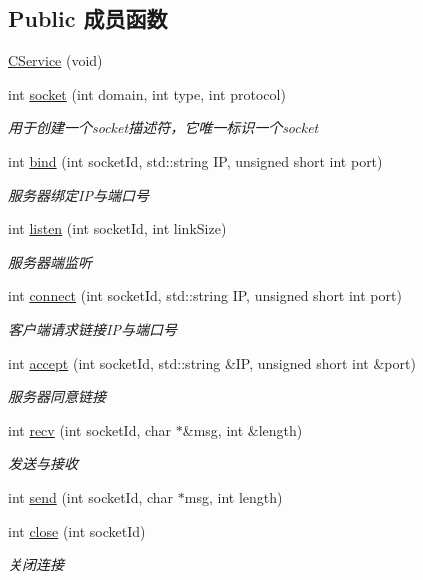 \subsection*{Public 成员函数}
\begin{DoxyCompactItemize}
\item 
\hyperlink{class_c_service_ac4fb853bd01a2b0d71399ab28de19cc6}{C\+Service} (void)
\item 
int \hyperlink{class_c_service_ae632f34f3aceab829b89ee46374658f2}{socket} (int domain, int type, int protocol)
\begin{DoxyCompactList}\small\item\em 用于创建一个socket描述符，它唯一标识一个socket \end{DoxyCompactList}\item 
int \hyperlink{class_c_service_ab345d03f1f85d053472b05de3ea211eb}{bind} (int socket\+Id, std\+::string IP, unsigned short int port)
\begin{DoxyCompactList}\small\item\em 服务器绑定\+I\+P与端口号 \end{DoxyCompactList}\item 
int \hyperlink{class_c_service_a32f59bebc1aef849f38b72218a87c674}{listen} (int socket\+Id, int link\+Size)
\begin{DoxyCompactList}\small\item\em 服务器端监听 \end{DoxyCompactList}\item 
int \hyperlink{class_c_service_a4788fc741e72baeaa5e15e459494f661}{connect} (int socket\+Id, std\+::string IP, unsigned short int port)
\begin{DoxyCompactList}\small\item\em 客户端请求链接\+I\+P与端口号 \end{DoxyCompactList}\item 
int \hyperlink{class_c_service_a694c7ac8c230b0d1d11bc98a32abcd71}{accept} (int socket\+Id, std\+::string \&IP, unsigned short int \&port)
\begin{DoxyCompactList}\small\item\em 服务器同意链接 \end{DoxyCompactList}\item 
int \hyperlink{class_c_service_a221d063aa8a89ecc84084e1bbd287210}{recv} (int socket\+Id, char $\ast$\&msg, int \&length)
\begin{DoxyCompactList}\small\item\em 发送与接收 \end{DoxyCompactList}\item 
int \hyperlink{class_c_service_a883e80cc5ea699e8408bbffe7c18414b}{send} (int socket\+Id, char $\ast$msg, int length)
\item 
int \hyperlink{class_c_service_abb0357bf57a735cc27f0e667d7e21787}{close} (int socket\+Id)
\begin{DoxyCompactList}\small\item\em 关闭连接 \end{DoxyCompactList}\end{DoxyCompactItemize}


